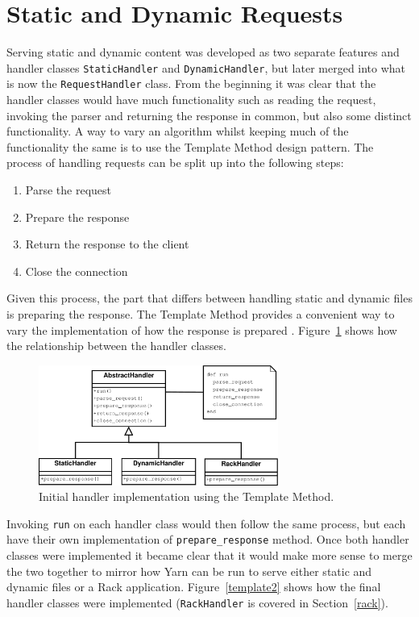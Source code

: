 \section{Static and Dynamic Requests}
Serving static and dynamic content was developed as two separate features and
handler classes \texttt{StaticHandler} and \texttt{DynamicHandler}, but
later merged into what is now the \texttt{RequestHandler} class. From the
beginning it was clear that the handler classes would have much functionality
such as reading the request, invoking the parser and returning the response in
common, but also some distinct functionality. A way to vary an algorithm
whilst keeping much of the functionality the same is to use the Template
Method design pattern. The process of handling requests can be split up into
the following steps:

\begin{enumerate}
  \item Parse the request
  \item Prepare the response
  \item Return the response to the client
  \item Close the connection
\end{enumerate}

Given this process, the part that differs between handling static and dynamic
files is preparing the response. The Template Method provides a
convenient way to vary the implementation of how the response is prepared
\cite{design_patterns}.  Figure~\ref{template} shows how the relationship
between the handler classes.

\begin{figure}[htb]
  \centering
  \includegraphics[width=0.7\textwidth]{diagrams/handlers.pdf}
  \caption{Initial handler implementation using the Template Method.}
  \label{template}
\end{figure}

Invoking \texttt{run} on each handler class would then follow the same process, but
each have their own implementation of \texttt{prepare\_response} method. Once
both handler classes were implemented it became clear that it would make more
sense to merge the two together to mirror how Yarn can be run to serve either
static and dynamic files or a Rack application. Figure~\ref{template2} shows
how the final handler classes were implemented (\texttt{RackHandler} is
covered in Section~\ref{rack}).

